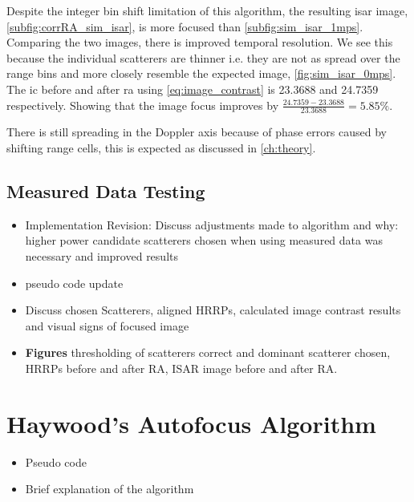 \documentclass[class=report,11pt,crop=false]{standalone}
\begin{document}
    Despite the integer bin shift limitation of this algorithm, the resulting \gls{isar} image, \autoref{subfig:corrRA_sim_isar}, is more focused than \autoref{subfig:sim_isar_1mps}. Comparing the two images, there is improved temporal resolution. We see this because the individual scatterers are thinner i.e. they are not as spread over the range bins and more closely resemble the expected image, \autoref{fig:sim_isar_0mps}. The \gls{ic} before and after \gls{ra} using \autoref{eq:image_contrast} is 23.3688 and 24.7359 respectively. Showing that the image focus improves by \( \frac{24.7359 - 23.3688}{23.3688} = 5.85\% \).

    There is still spreading in the Doppler axis because of phase errors caused by shifting range cells, this is expected as discussed in \autoref{ch:theory}.
    \subsection{Measured Data Testing}
    \begin{itemize}
        \item Implementation Revision: Discuss adjustments made to algorithm and why: higher power candidate scatterers chosen when using measured data was necessary and improved results
        \item pseudo code update
        \item Discuss chosen Scatterers, aligned HRRPs, calculated image contrast results and visual signs of focused image
        \item \textbf{Figures} thresholding of scatterers correct and dominant scatterer chosen, HRRPs before and after RA, ISAR image before and after RA.
    \end{itemize}

\section{Haywood's Autofocus Algorithm}
\begin{itemize}
    \item Pseudo code 
    \item Brief explanation of the algorithm
\end{itemize}
\end{document}
